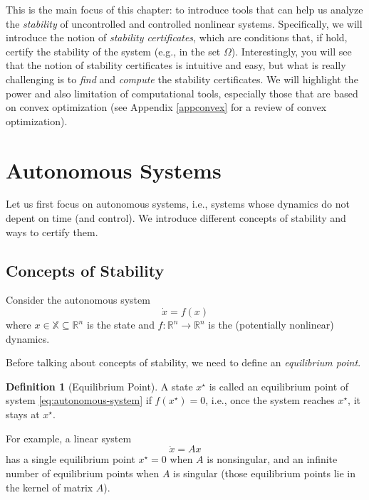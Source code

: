 \documentclass[
]{book}
\theoremstyle{definition}
\newtheorem{definition}{Definition}[chapter]
\theoremstyle{definition}
\theoremstyle{definition}
\theoremstyle{definition}
\theoremstyle{remark}
\begin{document}
This is the main focus of this chapter: to introduce tools that can help us analyze the \emph{stability} of uncontrolled and controlled nonlinear systems. Specifically, we will introduce the notion of \emph{stability certificates}, which are conditions that, if hold, certify the stability of the system (e.g., in the set \(\Omega\)). Interestingly, you will see that the notion of stability certificates is intuitive and easy, but what is really challenging is to \emph{find} and \emph{compute} the stability certificates. We will highlight the power and also limitation of computational tools, especially those that are based on convex optimization (see Appendix \ref{appconvex} for a review of convex optimization).

\hypertarget{autonomous-systems}{%
\section{Autonomous Systems}\label{autonomous-systems}}

Let us first focus on autonomous systems, i.e., systems whose dynamics do not depent on time (and control). We introduce different concepts of stability and ways to certify them.

\hypertarget{concepts-of-stability}{%
\subsection{Concepts of Stability}\label{concepts-of-stability}}

Consider the autonomous system
\begin{equation}
\dot{x} = f(x)
\label{eq:autonomous-system}
\end{equation}
where \(x \in \mathbb{X} \subseteq \mathbb{R}^n\) is the state and \(f: \mathbb{R}^n \rightarrow \mathbb{R}^n\) is the (potentially nonlinear) dynamics.

Before talking about concepts of stability, we need to define an \emph{equilibrium point}.

\begin{definition}[Equilibrium Point]
\protect\hypertarget{def:equilibriumpoint}{}\label{def:equilibriumpoint}A state \(x^\star\) is called an equilibrium point of system \eqref{eq:autonomous-system} if \(f(x^\star) = 0\), i.e., once the system reaches \(x^\star\), it stays at \(x^\star\).
\end{definition}

For example, a linear system
\[
\dot{x} = A x
\]
has a single equilibrium point \(x^\star = 0\) when \(A\) is nonsingular, and an infinite number of equilibrium points when \(A\) is singular (those equilibrium points lie in the kernel of matrix \(A\)).
\end{document}
